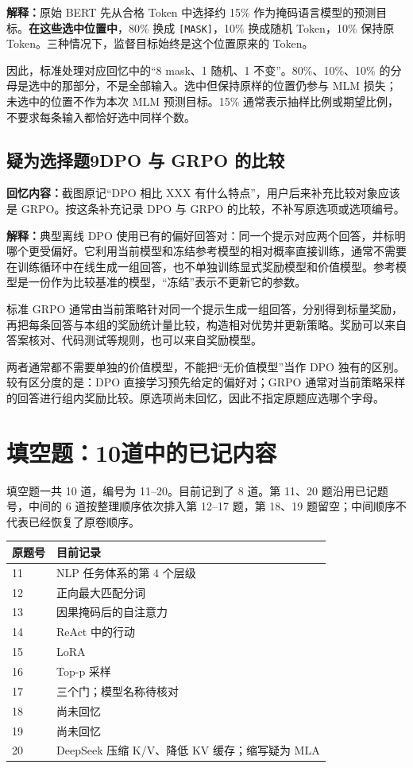 \documentclass[UTF8,a4paper,zihao=-4,fontset=windows]{ctexart}
\newcommand{\recalled}[1]{\Needspace{8\baselineskip}\subsection*{#1}}
\begin{document}
\textbf{解释：}原始 BERT 先从合格 Token 中选择约 15\% 作为掩码语言模型的预测目标。\textbf{在这些选中位置中}，80\% 换成 \texttt{[MASK]}，10\% 换成随机 Token，10\% 保持原 Token。三种情况下，监督目标始终是这个位置原来的 Token。

因此，标准处理对应回忆中的“8 mask、1 随机、1 不变”。80\%、10\%、10\% 的分母是选中的那部分，不是全部输入。选中但保持原样的位置仍参与 MLM 损失；未选中的位置不作为本次 MLM 预测目标。15\% 通常表示抽样比例或期望比例，不要求每条输入都恰好选中同样个数。

\recalled{疑为选择题9\quad DPO 与 GRPO 的比较}
\textbf{回忆内容：}截图原记“DPO 相比 XXX 有什么特点”，用户后来补充比较对象应该是 GRPO。按这条补充记录 DPO 与 GRPO 的比较，不补写原选项或选项编号。

\textbf{解释：}典型离线 DPO 使用已有的偏好回答对：同一个提示对应两个回答，并标明哪个更受偏好。它利用当前模型和冻结参考模型的相对概率直接训练，通常不需要在训练循环中在线生成一组回答，也不单独训练显式奖励模型和价值模型。参考模型是一份作为比较基准的模型，“冻结”表示不更新它的参数。

标准 GRPO 通常由当前策略针对同一个提示生成一组回答，分别得到标量奖励，再把每条回答与本组的奖励统计量比较，构造相对优势并更新策略。奖励可以来自答案核对、代码测试等规则，也可以来自奖励模型。

两者通常都不需要单独的价值模型，不能把“无价值模型”当作 DPO 独有的区别。较有区分度的是：DPO 直接学习预先给定的偏好对；GRPO 通常对当前策略采样的回答进行组内奖励比较。原选项尚未回忆，因此不指定原题应选哪个字母。

\section{填空题：10道中的已记内容}

填空题一共 10 道，编号为 11--20。目前记到了 8 道。第 11、20 题沿用已记题号，中间的 6 道按整理顺序依次排入第 12--17 题，第 18、19 题留空；中间顺序不代表已经恢复了原卷顺序。

\begin{center}
\begin{tabularx}{\linewidth}{|p{20mm}|X|}\hline
\textbf{原题号} & \textbf{目前记录}\\\hline
11 & NLP 任务体系的第 4 个层级\\\hline
12 & 正向最大匹配分词\\\hline
13 & 因果掩码后的自注意力\\\hline
14 & ReAct 中的行动\\\hline
15 & LoRA\\\hline
16 & Top-p 采样\\\hline
17 & 三个门；模型名称待核对\\\hline
18 & 尚未回忆\\\hline
19 & 尚未回忆\\\hline
20 & DeepSeek 压缩 K/V、降低 KV 缓存；缩写疑为 MLA\\\hline
\end{tabularx}
\end{center}
\end{document}
